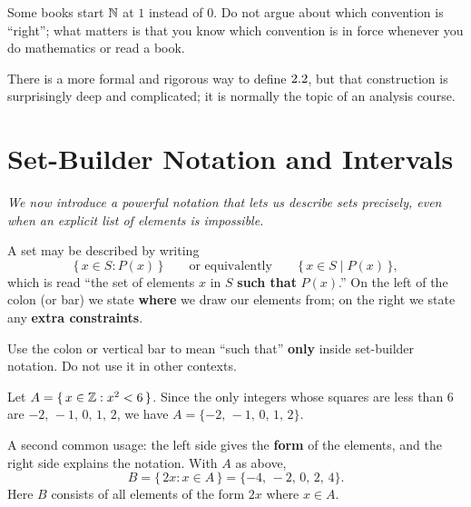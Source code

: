 \begin{remark}
Some books start $\mathbb{N}$ at $1$ instead of $0$.  Do not argue about which convention is ``right''; what matters is that you know which convention is in force whenever you do mathematics or read a book.
\end{remark}

\begin{remark}
There is a more formal and rigorous way to define $2.2$, but that construction is surprisingly deep and complicated; it is normally the topic of an analysis course.
\end{remark}

\section{Set-Builder Notation and Intervals}
\label{sec:1.2}

\textit{We now introduce a powerful notation that lets us describe sets precisely, even when an explicit list of elements is impossible.}

\begin{definition}
\label{def:1-5}
A set may be described by writing
\[
  \{\, x \in S : P(x) \,\} \qquad\text{or equivalently}\qquad \{\, x \in S \mid P(x) \,\},
\]
which is read ``the set of elements $x$ in $S$ \textbf{such that} $P(x)$\@.''  On the left of the colon (or bar) we state \textbf{where} we draw our elements from; on the right we state any \textbf{extra constraints}.
\end{definition}

\begin{remark}[Warning]
Use the colon or vertical bar to mean ``such that'' \textbf{only} inside set-builder notation.  Do not use it in other contexts.
\end{remark}

\begin{example}
\label{ex:1-2}
Let $A = \{\, x \in \mathbb{Z} : x^{2} < 6 \,\}$.  Since the only integers whose squares are less than $6$ are $-2,\,-1,\,0,\,1,\,2$, we have $A = \{-2,\,-1,\,0,\,1,\,2\}$.
\end{example}

\begin{example}
\label{ex:1-3}
A second common usage: the left side gives the \textbf{form} of the elements, and the right side explains the notation.  With $A$ as above,
\[
  B = \{\, 2x : x \in A \,\} = \{-4,\,-2,\,0,\,2,\,4\}.
\]
Here $B$ consists of all elements of the form $2x$ where $x \in A$.
\end{example}

